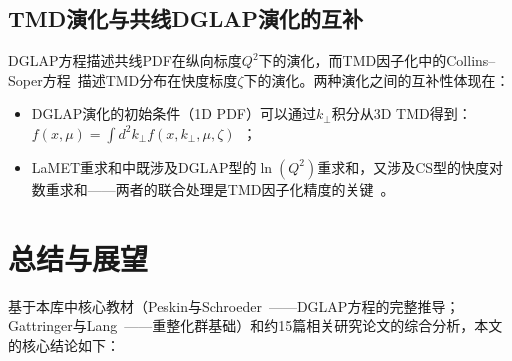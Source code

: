 \documentclass[12pt,a4paper]{ctexart}
\theoremstyle{definition}
\begin{document}
\subsection{TMD演化与共线DGLAP演化的互补}

DGLAP方程描述共线PDF在纵向标度$Q^2$下的演化，而TMD因子化中的Collins--Soper方程~\cite{Collins2011foundations}描述TMD分布在快度标度$\zeta$下的演化。两种演化之间的互补性体现在：
\begin{itemize}
    \item DGLAP演化的初始条件（1D PDF）可以通过$k_\perp$积分从3D TMD得到：$f(x, \mu) = \int d^2 k_\perp f(x, k_\perp, \mu, \zeta)$~\cite{He2024unpolTMD}；
    \item LaMET重求和中既涉及DGLAP型的$\ln(Q^2)$重求和，又涉及CS型的快度对数重求和——两者的联合处理是TMD因子化精度的关键~\cite{Su2023RGR}。
\end{itemize}

\section{总结与展望}

基于本库中核心教材（Peskin与Schroeder~\cite{PeskinSchroeder1995}——DGLAP方程的完整推导；Gattringer与Lang~\cite{GattringerLang2010}——重整化群基础）和约15篇相关研究论文的综合分析，本文的核心结论如下：
\end{document}

